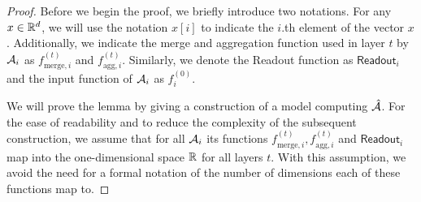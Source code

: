 \begin{proof}
    Before we begin the proof, we briefly introduce two notations. For any $x \in \mathbb{R}^d$, we will use the notation $x[i]$ to indicate the $i$.th element of the vector $x$. Additionally, we indicate the merge and aggregation function used in layer $t$ by $\mathcal{A}_i$ as $f^{(t)}_{\text{merge}, i}$ and $f^{(t)}_{\text{agg}, i}$. Similarly, we denote the \textsf{Readout} function as $\textsf{Readout}_i$ and the input function of $\mathcal{A}_i$ as $f^{(0)}_i$.
    
    We will prove the lemma by giving a construction of a \gnn model computing $\hat{\mathcal{A}}$. For the ease of readability and to reduce the complexity of the subsequent construction, we assume that for all $\mathcal{A}_i$ its functions $f^{(t)}_{\text{merge}, i}, f^{(t)}_{\text{agg}, i}$ and $\textsf{Readout}_i$ map into the one-dimensional space $\mathbb{R}$ for all layers $t$. With this assumption, we avoid the need for a formal notation of the number of dimensions each of these functions map to.


\end{proof}
